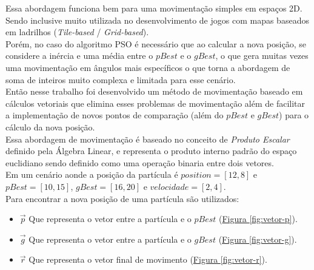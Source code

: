 Essa abordagem funciona bem para uma movimentação simples em espaços 2D. Sendo inclusive muito utilizada no desenvolvimento de jogos com mapas baseados em ladrilhos (\textit{Tile-based} / \textit{Grid-based}).\\
\indent Porém, no caso do algoritmo PSO é necessário que ao calcular a nova posição, se considere a inércia e uma média entre o $pBest$ e o $gBest$, o que gera muitas vezes uma movimentação em ângulos mais específicos o que torna a abordagem de soma de inteiros muito complexa e limitada para esse cenário.\\
\indent Então nesse trabalho foi desenvolvido um método de movimentação baseado em cálculos vetoriais que elimina esses problemas de movimentação além de facilitar a implementação de novos pontos de comparação (além do $pBest$ e $gBest$) para o cálculo da nova posição.\\
\indent Essa abordagem de movimentação é baseado no conceito de \textit{Produto Escalar} definido pela Álgebra Linear, e representa o produto interno padrão do espaço euclidiano sendo definido como uma operação binaria entre dois vetores.\\
\noindent Em um cenário aonde a posição da partícula é $position=[12,8]$ e $pBest=[10, 15]$, $gBest=[16,20]$ e $velocidade=[2,4]$.\\
\noindent Para encontrar a nova posição de uma partícula são utilizados:
\begin{itemize}
\item $\vec p$ Que representa o vetor entre a partícula e o $pBest$ 
(\hyperref[fig:vetor-p]{Figura \ref{fig:vetor-p}}).
\item $\vec g$ Que representa o vetor entre a partícula e o $gBest$ 
(\hyperref[fig:vetor-g]{Figura \ref{fig:vetor-g}}).
\item $\vec r$ Que representa o vetor final de movimento
(\hyperref[fig:vetor-r]{Figura \ref{fig:vetor-r}}).
\end{itemize}

